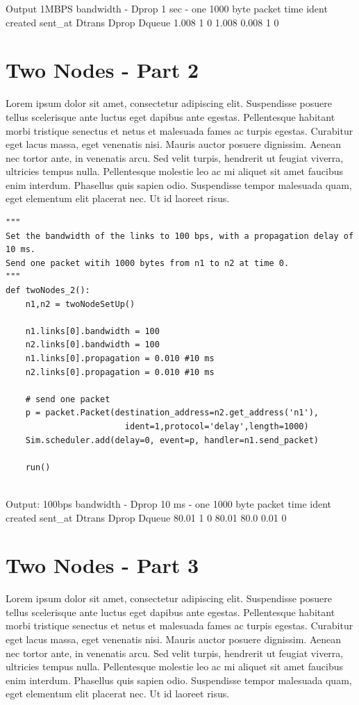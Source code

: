 \documentclass[11pt]{article}
\begin{document}
Output
1MBPS bandwidth - Dprop 1 sec - one 1000 byte packet
time    ident   created sent_at Dtrans  Dprop   Dqueue  
1.008   1       0       1.008   0.008   1       0

\section{Two Nodes - Part 2}

Lorem ipsum dolor sit amet, consectetur adipiscing elit. Suspendisse
posuere tellus scelerisque ante luctus eget dapibus ante
egestas. Pellentesque habitant morbi tristique senectus et netus et
malesuada fames ac turpis egestas. Curabitur eget lacus massa, eget
venenatis nisi. Mauris auctor posuere dignissim. Aenean nec tortor
ante, in venenatis arcu. Sed velit turpis, hendrerit ut feugiat
viverra, ultricies tempus nulla. Pellentesque molestie leo ac mi
aliquet sit amet faucibus enim interdum. Phasellus quis sapien
odio. Suspendisse tempor malesuada quam, eget elementum elit placerat
nec. Ut id laoreet risus.

\begin{lstlisting}
"""
Set the bandwidth of the links to 100 bps, with a propagation delay of 10 ms. 
Send one packet witih 1000 bytes from n1 to n2 at time 0.
"""
def twoNodes_2():
    n1,n2 = twoNodeSetUp()

    n1.links[0].bandwidth = 100
    n2.links[0].bandwidth = 100
    n1.links[0].propagation = 0.010 #10 ms
    n2.links[0].propagation = 0.010 #10 ms

    # send one packet
    p = packet.Packet(destination_address=n2.get_address('n1'),
                        ident=1,protocol='delay',length=1000)
    Sim.scheduler.add(delay=0, event=p, handler=n1.send_packet)

    run()


\end{lstlisting}
Output:
100bps bandwidth - Dprop 10 ms - one 1000 byte packet
time    ident   created sent_at Dtrans  Dprop   Dqueue  
80.01   1       0       80.01   80.0    0.01    0

\section{Two Nodes - Part 3}

Lorem ipsum dolor sit amet, consectetur adipiscing elit. Suspendisse
posuere tellus scelerisque ante luctus eget dapibus ante
egestas. Pellentesque habitant morbi tristique senectus et netus et
malesuada fames ac turpis egestas. Curabitur eget lacus massa, eget
venenatis nisi. Mauris auctor posuere dignissim. Aenean nec tortor
ante, in venenatis arcu. Sed velit turpis, hendrerit ut feugiat
viverra, ultricies tempus nulla. Pellentesque molestie leo ac mi
aliquet sit amet faucibus enim interdum. Phasellus quis sapien
odio. Suspendisse tempor malesuada quam, eget elementum elit placerat
nec. Ut id laoreet risus.
\end{document}

